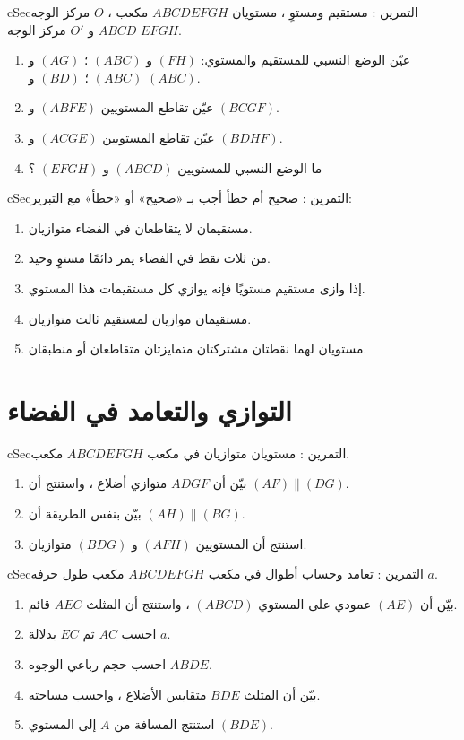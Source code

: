 \documentclass[12pt,a4paper]{article}
\newenvironment{BOX}[2]{\begin{otherlanguage}{english}\begin{arbox}{#1}{#2}}{\end{arbox}\end{otherlanguage}}
\newcounter{exo}
\newenvironment{tamrin}[1]{\stepcounter{exo}\begin{BOX}{cSec}{التمرين \theexo: #1}}{\end{BOX}}
\begin{document}
\begin{tamrin}{مستقيم ومستوٍ ، مستويان}
$ABCDEFGH$ مكعب ، $O$ مركز الوجه $ABCD$ و $O'$ مركز الوجه $EFGH$.
\begin{enumerate}
\item عيّن الوضع النسبي للمستقيم والمستوي: \quad $(FH)$ و $(ABC)$ \quad ؛ \quad $(AG)$ و $(ABC)$ \quad ؛ \quad $(BD)$ و $(ABC)$.
\item عيّن تقاطع المستويين $(ABFE)$ و $(BCGF)$.
\item عيّن تقاطع المستويين $(ACGE)$ و $(BDHF)$.
\item ما الوضع النسبي للمستويين $(ABCD)$ و $(EFGH)$ ؟
\end{enumerate}
\end{tamrin}

\begin{tamrin}{صحيح أم خطأ}
أجب بـ «صحيح» أو «خطأ» مع التبرير:
\begin{enumerate}
\item مستقيمان لا يتقاطعان في الفضاء متوازيان.
\item من ثلاث نقط في الفضاء يمر دائمًا مستوٍ وحيد.
\item إذا وازى مستقيم مستويًا فإنه يوازي كل مستقيمات هذا المستوي.
\item مستقيمان موازيان لمستقيم ثالث متوازيان.
\item مستويان لهما نقطتان مشتركتان متمايزتان متقاطعان أو منطبقان.
\end{enumerate}
\end{tamrin}

\section{التوازي والتعامد في الفضاء}
\begin{tamrin}{مستويان متوازيان في مكعب}
$ABCDEFGH$ مكعب.
\begin{enumerate}
\item بيّن أن $ADGF$ متوازي أضلاع ، واستنتج أن $(AF)\parallel(DG)$.
\item بيّن بنفس الطريقة أن $(AH)\parallel(BG)$.
\item استنتج أن المستويين $(AFH)$ و $(BDG)$ متوازيان.
\end{enumerate}
\end{tamrin}

\begin{tamrin}{تعامد وحساب أطوال في مكعب}
$ABCDEFGH$ مكعب طول حرفه $a$.
\begin{enumerate}
\item بيّن أن $(AE)$ عمودي على المستوي $(ABCD)$ ، واستنتج أن المثلث $AEC$ قائم.
\item احسب $AC$ ثم $EC$ بدلالة $a$.
\item احسب حجم رباعي الوجوه $ABDE$.
\item بيّن أن المثلث $BDE$ متقايس الأضلاع ، واحسب مساحته.
\item استنتج المسافة من $A$ إلى المستوي $(BDE)$.
\end{enumerate}
\end{tamrin}
\end{document}
